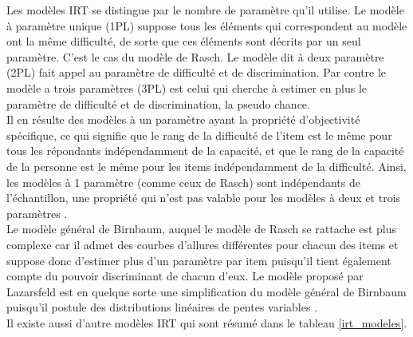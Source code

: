Les modèles IRT se distingue par le nombre de paramètre qu’il utilise. Le modèle à paramètre unique (1PL) suppose tous les éléments qui correspondent au modèle ont la même difficulté, de sorte que ces éléments sont décrits par un seul paramètre. C’est le cas du modèle de Rasch. Le modèle dit à deux paramètre (2PL) fait appel au paramètre de difficulté et de discrimination. Par contre le modèle a trois paramètres (3PL) est celui qui cherche à estimer en plus le paramètre de difficulté et de discrimination, la pseudo chance. \\
Il en résulte des modèles à un paramètre ayant la propriété d'objectivité spécifique, ce qui signifie que le rang de la difficulté de l'item est le même pour tous les répondants indépendamment de la capacité, et que le rang de la capacité de la personne est le même pour les items indépendamment de la difficulté. Ainsi, les modèles à 1 paramètre (comme ceux de Rasch) sont indépendants de l'échantillon, une propriété qui n'est pas valable pour les modèles à deux et trois paramètres \cite{fisher1922mathematical}. \\
Le modèle général de Birnbaum, auquel le modèle de Rasch se rattache est plus complexe car il admet des courbes d’allures différentes pour chacun des items et suppose donc d’estimer plus d’un paramètre par item puisqu’il tient également compte du pouvoir discriminant de chacun d’eux. Le modèle proposé par Lazarsfeld est en quelque sorte une simplification du modèle général de Birnbaum puisqu’il postule des distributions linéaires de pentes variables \cite{yvonnick_2019}. \\
Il existe aussi d’autre modèles IRT qui sont résumé dans le tableau \ref{irt_modeles}.

